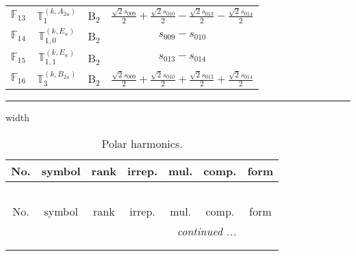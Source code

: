 \documentclass[fleqn,10pt,landscape]{article}
\begin{document}
\begin{itemize}
\begin{center}
\begin{longtable}{c|c|c|c}
$ \mathbb{F}_{13} $ & $\mathbb{T}_{1}^{(k,A_{2u})}$ & B$_{2}$ & $\frac{\sqrt{2} s_{009}}{2} + \frac{\sqrt{2} s_{010}}{2} - \frac{\sqrt{2} s_{013}}{2} - \frac{\sqrt{2} s_{014}}{2}$ \\
$ \mathbb{F}_{14} $ & $\mathbb{T}_{1,0}^{(k,E_{u})}$ & B$_{2}$ & $s_{009} - s_{010}$ \\
$ \mathbb{F}_{15} $ & $\mathbb{T}_{1,1}^{(k,E_{u})}$ & B$_{2}$ & $s_{013} - s_{014}$ \\
$ \mathbb{F}_{16} $ & $\mathbb{T}_{3}^{(k,B_{2u})}$ & B$_{2}$ & $\frac{\sqrt{2} s_{009}}{2} + \frac{\sqrt{2} s_{010}}{2} + \frac{\sqrt{2} s_{013}}{2} + \frac{\sqrt{2} s_{014}}{2}$ \\
\end{longtable}
\end{center}

 \hfil \hrule height 1mm width \textwidth \hfil

\begin{center}
\renewcommand{\arraystretch}{1.3}
\begin{longtable}{ccccccc}
\caption{Polar harmonics.}
 \\
 \hline \hline
No. & symbol & rank & irrep. & mul. & comp. & form \\ \hline \endfirsthead

\multicolumn{6}{l}{\tablename\ \thetable{}} \\
 \hline \hline
No. & symbol & rank & irrep. & mul. & comp. & form \\ \hline \endhead

 \hline \hline
\multicolumn{6}{r}{\footnotesize\it continued ...} \\ \endfoot

 \hline \hline
\multicolumn{6}{r}{} \\ \endlastfoot


\end{longtable}
\end{center}
\end{itemize}
\end{document}
